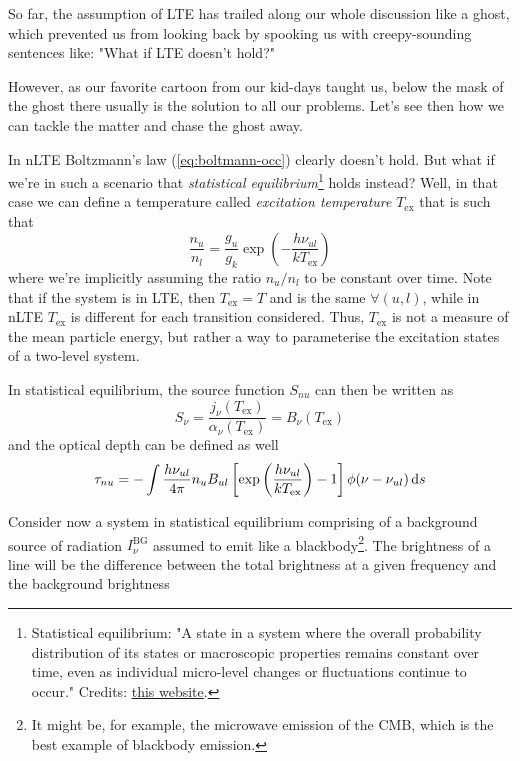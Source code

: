 So far, the assumption of LTE has trailed along our whole discussion like a ghost, which prevented us from looking back by spooking us with creepy-sounding sentences like: "What if LTE doesn't hold?"
\par However, as our favorite cartoon from our kid-days taught us, below the mask of the ghost there usually is the solution to all our problems. Let's see then how we can tackle the matter and chase the ghost away.
\par In nLTE Boltzmann's law (\ref{eq:boltmann-occ}) clearly doesn't hold. But what if we're in such a scenario that \emph{statistical equilibrium}\footnote{Statistical equilibrium: "A state in a system where the overall probability distribution of its states or macroscopic properties remains constant over time, even as individual micro-level changes or fluctuations continue to occur." Credits: \href{https://www.sciencedirect.com/topics/mathematics/statistical-equilibrium}{this website}.} holds instead? Well, in that case we can define a temperature called \emph{excitation temperature} $T_{\text{ex}}$ that is such that 
\begin{equation}
    \frac{n_{u}}{n_{l}} = \frac{g_{u}}{g_{k}}\exp\left(-\frac{h\nu_{ul}}{kT_{\text{ex}}}\right)
    \label{eq:excitationtemperature}
\end{equation}
where we're implicitly assuming the ratio $n_{u}/n_{l}$ to be constant over time. Note that if the system is in LTE, then $T_{\text{ex}} = T$ and is the same $\forall (u,l)$, while in nLTE $T_{\text{ex}}$ is different for each transition considered. Thus, $T_{\text{ex}}$ is not a measure of the mean particle energy, but rather a way to parameterise the excitation states of a two-level system.
\par In statistical equilibrium, the source function $S_{nu}$ can then be written as 
\begin{equation}
    S_{\nu} = \frac{j_{\nu}(T_{\text{ex}})}{\alpha_{\nu}(T_{\text{ex}})} = B_{\nu}(T_{\text{ex}})
\end{equation}
and the optical depth can be defined as well 
\begin{equation}
    \tau_{nu} = - \int \frac{h\nu_{ul}}{4\pi}n_{u}B_{ul}\left[\exp\left(\frac{h\nu_{ul}}{kT_{\text{ex}}}\right)-1\right]\phi(\nu-\nu_{ul})\,\text{d}s
    \label{eq:od-einstein}
\end{equation}
\par Consider now a system in statistical equilibrium comprising of a background source of radiation $I_{\nu}^{\text{BG}}$ assumed to emit like a blackbody\footnote{It might be, for example, the microwave emission of the CMB, which is the best example of blackbody emission.}. The brightness of a line will be the difference between the total brightness at a given frequency and the background brightness
